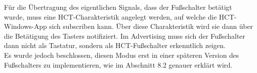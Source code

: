 Für die Übertragung des eigentlichen Signals, dass der Fußschalter betätigt wurde, muss eine HCT-Charakteristik angelegt werden, auf welche die HCT-Windows-App sich subscriben kann. Über diese Charakteristik wird sie dann über die Betätigung des Tasters notifiziert. Im Advertising muss sich der Fußschalter dann nicht als Tastatur, sondern als HCT-Fußschalter erkenntlich zeigen.\\
Es wurde jedoch beschlossen, diesen Modus erst in einer späteren Version des Fußschalters zu implementieren, wie im Abschnitt 8.2 genauer erklärt wird.